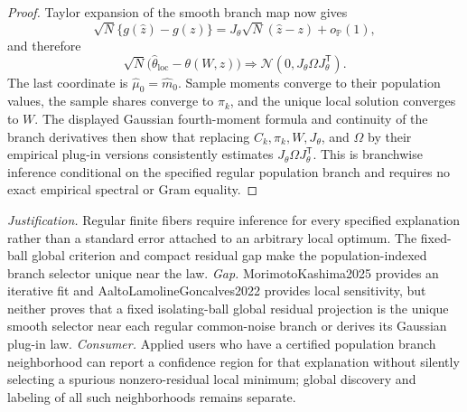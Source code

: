 \documentclass{article}
\begin{document}
\begin{proof}
Taylor expansion of the smooth branch map now gives
\[
 \sqrt N\{g(\widehat z)-g(z)\}
 =J_\theta\sqrt N(\widehat z-z)+o_{\mathbb P}(1),
\]
and therefore
\[
 \sqrt N\bigl(\widehat\theta_{\mathrm{loc}}-\theta(W,z)\bigr)
 \Longrightarrow\mathcal N(0,J_\theta\Omega J_\theta^{\mathsf T}).
\]
The last coordinate is \(\widehat\mu_0=\widehat m_0\).  Sample moments converge to their population values, the sample shares converge to \(\pi_k\), and the unique local solution converges to \(W\).  The displayed Gaussian fourth-moment formula and continuity of the branch derivatives then show that replacing \(C_k,\pi_k,W,J_\theta\), and \(\Omega\) by their empirical plug-in versions consistently estimates \(J_\theta\Omega J_\theta^{\mathsf T}\).  This is branchwise inference conditional on the specified regular population branch and requires no exact empirical spectral or Gram equality.
\end{proof}
\par\smallskip\noindent \textit{Justification.} Regular finite fibers require inference for every specified explanation rather than a standard error attached to an arbitrary local optimum.  The fixed-ball global criterion and compact residual gap make the population-indexed branch selector unique near the law. \textit{Gap.} MorimotoKashima2025 provides an iterative fit and AaltoLamolineGoncalves2022 provides local sensitivity, but neither proves that a fixed isolating-ball global residual projection is the unique smooth selector near each regular common-noise branch or derives its Gaussian plug-in law. \textit{Consumer.} Applied users who have a certified population branch neighborhood can report a confidence region for that explanation without silently selecting a spurious nonzero-residual local minimum; global discovery and labeling of all such neighborhoods remains separate.
\end{document}
